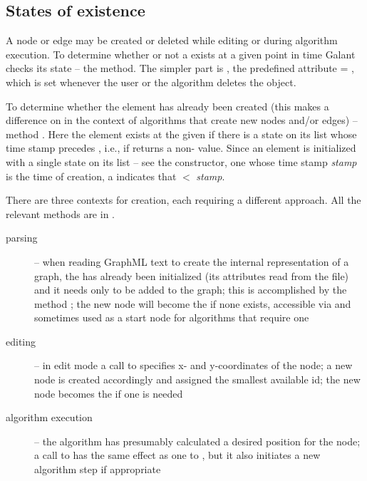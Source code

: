 \subsection{States of existence}

A node or edge may be created or deleted while editing or during algorithm
execution. To determine whether or not a  exists at a
given point in time Galant checks its state -- the 
method. The simpler part is , the predefined attribute
 = , which is set whenever the user or the
algorithm deletes the object.

To determine whether the element has already been created (this makes a
difference on in the context of algorithms that create new nodes and/or
edges) -- method . Here the element exists at the
given  if there is a state on its list whose time stamp precedes
, i.e., if  returns a non-
value. Since an element is initialized with a single state on its list -- see
the constructor, one
whose time stamp \emph{stamp} is the time of creation, a 
indicates that  $<$ \emph{stamp}.

There are three contexts for  creation, each requiring a different
approach. All the relevant methods are in .
\begin{description}
\item[parsing] -- when reading GraphML text to create the internal
  representation of a graph, the  has already been initialized
  (its attributes read from the file) and it needs only to be added to the
  graph; this is accomplished by the method ; the new
  node will become the  if none exists, accessible via
   and sometimes used as a start node for algorithms
  that require one
\item[editing] -- in edit mode a call to
   specifies x- and y-coordinates of
  the node; a new node is created accordingly and assigned the smallest
  available id; the new node becomes the  if one is needed
\item[algorithm execution] -- the algorithm has presumably calculated a
  desired position for the node; a call to 
  has the same effect as one to , but it also initiates
  a new algorithm step if appropriate
\end{description}

